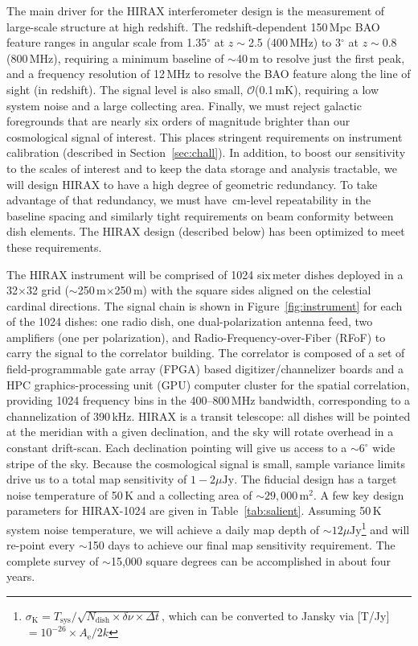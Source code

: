 \documentclass[]{spie}  %
\begin{document}
The main driver for the HIRAX interferometer design is the measurement of large-scale structure at high redshift. The redshift-dependent 150\,Mpc BAO feature ranges in angular scale from 1.35$^{\circ}$ at $z\sim$2.5 (400\,MHz) to 3$^{\circ}$ at $z\sim$0.8 (800\,MHz), requiring a minimum baseline of $\sim$40\,m to resolve just the first peak, and a frequency resolution of 12\,MHz to resolve the BAO feature along the line of sight (in redshift). The signal level is also small, $\mathcal{O}$(0.1\,mK), requiring a low system noise and a large collecting area. Finally, we must reject galactic foregrounds that are nearly six orders of magnitude brighter than our cosmological signal of interest. This places stringent requirements on instrument calibration (described in Section~\ref{sec:chall}). In addition, to boost our sensitivity to the scales of interest and to keep the data storage and analysis tractable, we will design HIRAX to have a high degree of geometric redundancy. To take advantage of that redundancy, we must have \,cm-level repeatability in the baseline spacing and similarly tight requirements on beam conformity between dish elements. The HIRAX design (described below) has been optimized to meet these requirements. \newline 

The HIRAX instrument will be comprised of 1024 six\,meter dishes deployed in a 32$\times$32 grid ($\sim$250\,m$\times$250\,m) with the square sides aligned on the celestial cardinal directions. The signal chain is shown in Figure~\ref{fig:instrument} for each of the 1024 dishes: one radio dish, one dual-polarization antenna feed, two amplifiers (one per polarization), and Radio-Frequency-over-Fiber (RFoF) to carry the signal to the correlator building. The correlator is composed of a set of field-programmable gate array (FPGA) based digitizer/channelizer boards and a HPC graphics-processing unit (GPU) computer cluster for the spatial correlation, providing 1024 frequency bins in the 400--800\,MHz bandwidth, corresponding to a channelization of 390\,kHz. HIRAX is a transit telescope: all dishes will be pointed at the meridian with a given declination, and the sky will rotate overhead in a constant drift-scan. Each declination pointing will give us access to a $\sim6^{\circ}$ wide stripe of the sky. Because the cosmological signal is small, sample variance limits drive us to a total map sensitivity of $1-2\mu\mathrm{Jy}$. The fiducial design has a target noise temperature of 50\,K and a collecting area of $\sim29,000\,\mathrm{m}^{2}$. A few key design parameters for HIRAX-1024 are given in Table~\ref{tab:salient}. Assuming 50\,K system noise temperature, we will achieve a daily map depth of $\sim12\mu\mathrm{Jy}$\footnote{$\sigma_{\mathrm{K}} = T_{\mathrm{sys}} / \sqrt{N_{\mathrm{dish}} \times \delta\nu \times \Delta t}$, which can be converted to Jansky via [T/Jy]$ = 10^{-26} \times A_{\mathrm{e}} / 2k$} and will re-point every $\sim$150 days to achieve our final map sensitivity requirement. The complete survey of $\sim$15,000 square degrees can be accomplished in about four years.
\newline
\end{document}
